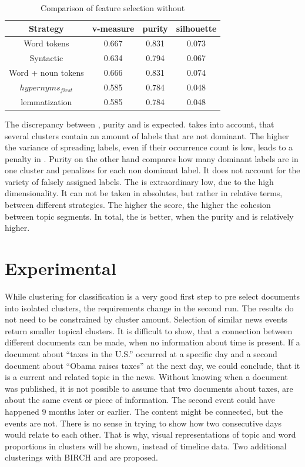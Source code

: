   \begin{table}[h!]\label{comparison_single_without_lsa}
    \begin{tabular}{ c | c | c | c }
      Strategy    & v-measure & purity  & silhouette \\ \hline
      Word tokens & 0.667     & 0.831   & 0.073      \\
      Syntactic   & 0.634     & 0.794     & 0.067 \\
      Word + noun tokens & 0.666   & 0.831     & 0.074 \\
      \wordnet{} $hypernyms_{first}$ & 0.585   & 0.784     & 0.048 \\
      \wordnet{} lemmatization   & 0.585   & 0.784     & 0.048 \\
    \end{tabular}
    \caption{Comparison of feature selection without \lsa{}}
  \end{table}

The discrepancy between \vmeasure{}, purity and \silco{} is expected. \vmeasure{} takes into account, that several clusters contain an amount of labels that are not dominant. The higher the variance of spreading labels, even if their occurrence count is low, leads to a penalty in \vmeasure{}. Purity on the other hand compares how many dominant labels are in one cluster and penalizes for each non dominant label. It does not account for the variety of falsely assigned labels. The \silco{} is extraordinary low, due to the high dimensionality. It can not be taken in absolutes, but rather in relative terms, between different strategies. The higher the score, the higher the cohesion between topic segments. In total, the \silco{} is better, when the purity and \vmeasure{} is relatively higher.

\section{Experimental}
While clustering for classification is a very good first step to pre select documents into isolated clusters, the requirements change in the second run. The results do not need to be constrained by cluster amount. Selection of similar news events return smaller topical clusters. It is difficult to show, that a connection between different documents can be made, when no information about time is present. If a document about ``taxes in the U.S.'' occurred at a specific day and a second document about ``Obama raises taxes'' at the next day, we could conclude, that it is a current and related topic in the news. Without knowing when a document was published, it is not possible to assume that two documents about taxes, are about the same event or piece of information. The second event could have happened 9 months later or earlier. The content might be connected, but the events are not. There is no sense in trying to show how two consecutive days would relate to each other. That is why, visual representations of topic and word proportions in clusters will be shown, instead of timeline data. Two additional clusterings with BIRCH and \lda{} are proposed.\\


